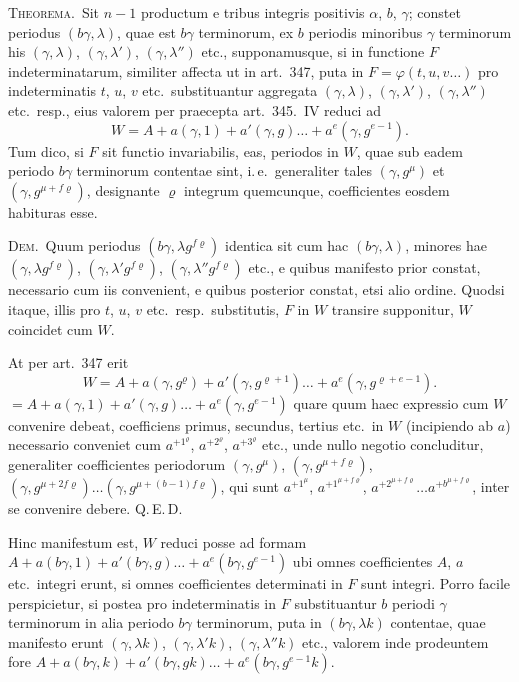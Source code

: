 \documentclass[12pt,a4paper]{article}
\theoremstyle{plain}
\theoremstyle{definition}
\theoremstyle{remark}
\begin{document}
\textsc{Theorema.}\ Sit $n-1$ productum e tribus integris positivis $\alpha$, $b$, $\gamma$; constet periodus $(b\gamma,\lambda)$, quae est $b\gamma$ terminorum, ex $b$ periodis minoribus $\gamma$ terminorum his $(\gamma,\lambda)$, $(\gamma,\lambda')$, $(\gamma,\lambda'')$ etc., supponamusque, si in functione $F$ indeterminatarum, similiter affecta ut in art.\ 347, puta in $F=\varphi(t,u,v\ldots)$ pro indeterminatis $t$, $u$, $v$ etc.\ substituantur aggregata $(\gamma,\lambda)$, $(\gamma,\lambda')$, $(\gamma,\lambda'')$ etc.\ resp., eius valorem per praecepta art.\ 345.\ IV reduci ad
\[W=A+a(\gamma,1)+a'(\gamma,g)\ldots+a^e(\gamma,g^{e-1}).\]
Tum dico, si $F$ sit functio invariabilis, eas, periodos in $W$, quae sub eadem periodo $b\gamma$ terminorum contentae sint, i.\,e.\ generaliter tales $(\gamma,g^\mu)$ et $(\gamma,g^{\mu+f\varrho})$, designante $\varrho$ integrum quemcunque, coefficientes eosdem habituras esse.

\textsc{Dem.}\ Quum periodus $(b\gamma,\lambda g^{f\varrho})$ identica sit cum hac $(b\gamma,\lambda)$, minores hae $(\gamma,\lambda g^{f\varrho})$, $(\gamma,\lambda' g^{f\varrho})$, $(\gamma,\lambda'' g^{f\varrho})$ etc., e quibus manifesto prior constat, necessario cum iis convenient, e quibus posterior constat, etsi alio ordine. Quodsi itaque, illis pro $t$, $u$, $v$ etc.\ resp.\ substitutis, $F$ in $W$ transire supponitur, $W$ coincidet cum $W$.

At per art.\ 347 erit
\[W=A+a(\gamma,g^\varrho)+a'(\gamma,g^{\varrho+1})\ldots+a^e(\gamma,g^{\varrho+e-1}).\]
$=A+a(\gamma,1)+a'(\gamma,g)\ldots+a^e(\gamma,g^{e-1})$ quare quum haec expressio cum $W$ convenire debeat, coefficiens primus, secundus, tertius etc.\ in $W$ (incipiendo ab $a$) necessario conveniet cum $a^{+1^{\varrho}}$, $a^{+2^{\varrho}}$, $a^{+3^{\varrho}}$ etc., unde nullo negotio concluditur, generaliter coefficientes periodorum $(\gamma,g^\mu)$, $(\gamma,g^{\mu+f\varrho})$, $(\gamma,g^{\mu+2f\varrho})\ldots(\gamma,g^{\mu+(b-1)f\varrho})$, qui sunt $a^{+1^{\mu}}$, $a^{+1^{\mu+f\varrho}}$, $a^{+2^{\mu+f\varrho}}\ldots a^{+b^{\mu+f\varrho}}$, inter se convenire debere. Q.\,E.\,D.

Hinc manifestum est, $W$ reduci posse ad formam $A+a(b\gamma,1)+a'(b\gamma,g)\ldots+a^e(b\gamma,g^{e-1})$ ubi omnes coefficientes $A$, $a$ etc.\ integri erunt, si omnes coefficientes determinati in $F$ sunt integri. Porro facile perspicietur, si postea pro indeterminatis in $F$ substituantur $b$ periodi $\gamma$ terminorum in alia periodo $b\gamma$ terminorum, puta in $(b\gamma,\lambda k)$ contentae, quae manifesto erunt $(\gamma,\lambda k)$, $(\gamma,\lambda'k)$, $(\gamma,\lambda''k)$ etc., valorem inde prodeuntem fore $A+a(b\gamma,k)+a'(b\gamma,gk)\ldots+a^e(b\gamma,g^{e-1}k)$.
\end{document}
